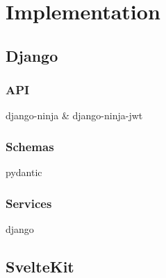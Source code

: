 \section{Implementation}

\subsection{Django}

\subsubsection{API}
django-ninja \& django-ninja-jwt
\subsubsection{Schemas}
pydantic
\subsubsection{Services}
django

\subsection{SvelteKit}







